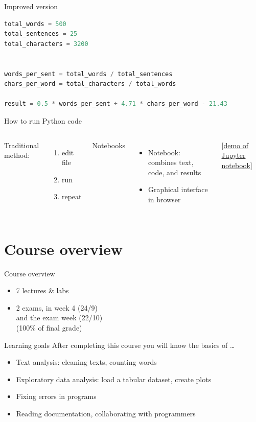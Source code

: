 \documentclass[aspectratio=169,usenames,dvipsnames]{beamer}
\begin{document}
\begin{frame}[fragile]{Improved version}
\begin{lstlisting}[language=python]
total_words = 500
total_sentences = 25
total_characters = 3200


words_per_sent = total_words / total_sentences
chars_per_word = total_characters / total_words

result = 0.5 * words_per_sent + 4.71 * chars_per_word - 21.43
\end{lstlisting}
\end{frame}


\begin{frame}{How to run Python code}
	\begin{columns}
			Traditional method:
			\begin{enumerate}
				\item edit file
				\item run
				\item repeat
			\end{enumerate}
			Notebooks
			\begin{itemize}
				\item Notebook: combines text, code, and results
				\item Graphical interface in browser
			\end{itemize}
            [\href{http://mybinder.org/v2/gh/binder-examples/requirements/master}{demo of Jupyter notebook}]
	\end{columns}
\end{frame}



\section{Course overview}
\frame{\tableofcontents[currentsection]}

\begin{frame}{Course overview}
    \begin{itemize}
       \item 7 lectures \& labs
       \item 2 exams, in week 4 (24/9) \\
            and the exam week (22/10) \\
           (100\% of final grade)
    \end{itemize}
\end{frame}

\begin{frame}{Learning goals}
    After completing this course you will know the basics of \dots
    \begin{itemize}
        \item Text analysis: cleaning texts, counting words
        \item Exploratory data analysis: load a tabular dataset, create plots
        \item Fixing errors in programs
        \item Reading documentation, collaborating with programmers
    \end{itemize}
\end{frame}
\end{document}

